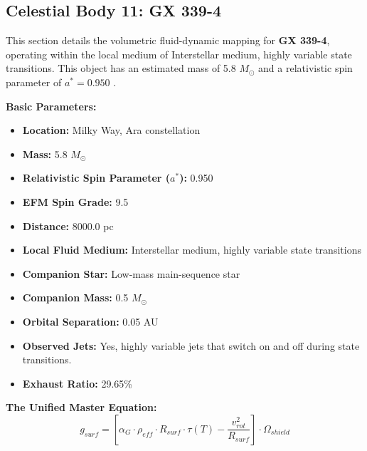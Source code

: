 \documentclass[11pt, a4paper]{article}
\begin{document}
\clearpage
\subsection{Celestial Body 11: GX 339-4}
This section details the volumetric fluid-dynamic mapping for \textbf{GX 339-4}, operating within the local medium of Interstellar medium, highly variable state transitions. This object has an estimated mass of 5.8 $M_{\odot}$ and a relativistic spin parameter of $a^* = 0.950$ \cite{heida2017, simbad}.

\vspace{0.5em}
\noindent \textbf{Basic Parameters:}
\begin{itemize}
  \item \textbf{Location:} Milky Way, Ara constellation
  \item \textbf{Mass:} 5.8 $M_{\odot}$
  \item \textbf{Relativistic Spin Parameter ($a^*$):} 0.950
  \item \textbf{EFM Spin Grade:} 9.5
  \item \textbf{Distance:} 8000.0 pc
  \item \textbf{Local Fluid Medium:} Interstellar medium, highly variable state transitions
  \item \textbf{Companion Star:} Low-mass main-sequence star
  \item \textbf{Companion Mass:} 0.5 $M_{\odot}$
  \item \textbf{Orbital Separation:} 0.05 AU
  \item \textbf{Observed Jets:} Yes, highly variable jets that switch on and off during state transitions.
  \item \textbf{Exhaust Ratio:} 29.65\%
\end{itemize}

\vspace{0.5em}
\noindent \textbf{The Unified Master Equation:}
$$ g_{surf} = \left[ \alpha_G \cdot \rho_{eff} \cdot R_{surf} \cdot \tau(T) - \frac{v_{rot}^2}{R_{surf}} \right] \cdot \Omega_{shield} $$
\end{document}
